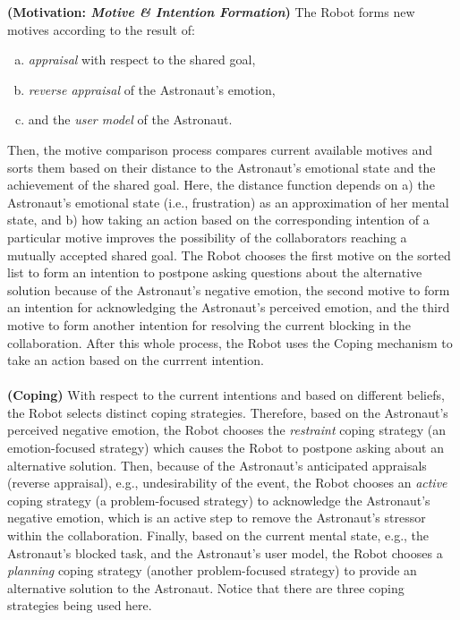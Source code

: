 \noindent \textbf{(Motivation: \textit{Motive \& Intention Formation})}
The Robot forms new motives according to the result of:

\begin{enumerate}[a)]
  \item \textit{appraisal} with respect to the shared goal,
  \item \textit{reverse appraisal} of the Astronaut's emotion,
  \item and the \textit{user model} of the Astronaut.
\end{enumerate}

Then, the motive comparison process compares current available motives and
sorts them based on their distance to the Astronaut's emotional state and
the achievement of the shared goal. Here, the distance function depends on a)
the Astronaut's emotional state (i.e., frustration) as an approximation of her
mental state, and b) how taking an action based on the corresponding intention
of a particular motive improves the possibility of the collaborators reaching a
mutually accepted shared goal. The Robot chooses the first motive on the sorted
list to form an intention to postpone asking questions about the alternative
solution because of the Astronaut's negative emotion, the second motive to form
an intention for acknowledging the Astronaut's perceived emotion, and the third
motive to form another intention for resolving the current blocking in the
collaboration. After this whole process, the Robot uses the Coping mechanism to
take an action based on the currrent intention.\\

\noindent {}\\

\noindent \textbf{(Coping)} With respect to the current intentions and based on
different beliefs, the Robot selects distinct coping strategies. Therefore,
based on the Astronaut's perceived negative emotion, the Robot chooses the
\textit{restraint} coping strategy (an emotion-focused strategy) which causes
the Robot to postpone asking about an alternative solution. Then, because of the
Astronaut's anticipated appraisals (reverse appraisal), e.g., undesirability of
the event, the Robot chooses an \textit{active} coping strategy (a
problem-focused strategy) to acknowledge the Astronaut's negative emotion, which
is an active step to remove the Astronaut's stressor within the collaboration.
Finally, based on the current mental state, e.g., the Astronaut's blocked task,
and the Astronaut's user model, the Robot chooses a \textit{planning} coping
strategy (another problem-focused strategy) to provide an alternative solution
to the Astronaut. Notice that there are three coping strategies being used
here.\\

